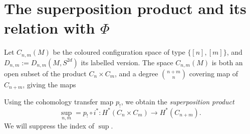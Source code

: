 \section{The superposition product and its relation with $\Phi$}\label{sec:superpositionprodefinition}
Let $C_{n,m}(M)$ be the coloured configuration space of type $\{[n],[m]\}$, 
and $D_{n,m}:=D_{n,m}(M,S^{2d})$ its labelled version. 
The space $C_{n,m}(M)$ is both an open subset of the product $C_n\times C_m$, and a degree
${{n+m} \choose n}$ 
covering map of $C_{n+m}$, giving the maps
\begin{center}
\end{center}
Using the cohomology transfer map $p_!$, we obtain the \textit{superposition product} $${\sup}_{n,m}=p_{!}\circ i^{*}: H^*(C_n\times C_m)\to H^*(C_{n+m}).$$
We will suppress the index of $\sup$.

